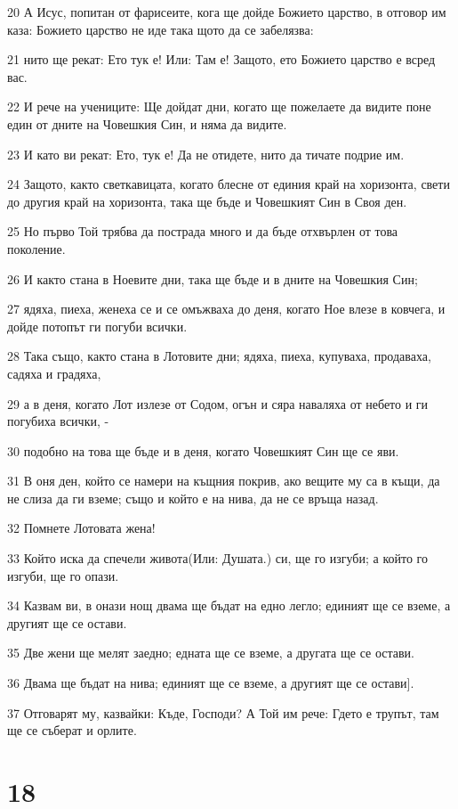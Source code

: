 \par 20 А Исус, попитан от фарисеите, кога ще дойде Божието царство, в отговор им каза: Божието царство не иде така щото да се забелязва:
\par 21 нито ще рекат: Ето тук е! Или: Там е! Защото, ето Божието царство е всред вас.
\par 22 И рече на учениците: Ще дойдат дни, когато ще пожелаете да видите поне един от дните на Човешкия Син, и няма да видите.
\par 23 И като ви рекат: Ето, тук е! Да не отидете, нито да тичате подрие им.
\par 24 Защото, както светкавицата, когато блесне от единия край на хоризонта, свети до другия край на хоризонта, така ще бъде и Човешкият Син в Своя ден.
\par 25 Но първо Той трябва да пострада много и да бъде отхвърлен от това поколение.
\par 26 И както стана в Ноевите дни, така ще бъде и в дните на Човешкия Син;
\par 27 ядяха, пиеха, женеха се и се омъжваха до деня, когато Ное влезе в ковчега, и дойде потопът ги погуби всички.
\par 28 Така също, както стана в Лотовите дни; ядяха, пиеха, купуваха, продаваха, садяха и градяха,
\par 29 а в деня, когато Лот излезе от Содом, огън и сяра наваляха от небето и ги погубиха всички, -
\par 30 подобно на това ще бъде и в деня, когато Човешкият Син ще се яви.
\par 31 В оня ден, който се намери на къщния покрив, ако вещите му са в къщи, да не слиза да ги вземе; също и който е на нива, да не се връща назад.
\par 32 Помнете Лотовата жена!
\par 33 Който иска да спечели живота(Или: Душата.) си, ще го изгуби; а който го изгуби, ще го опази.
\par 34 Казвам ви, в онази нощ двама ще бъдат на едно легло; единият ще се вземе, а другият ще се остави.
\par 35 Две жени ще мелят заедно; едната ще се вземе, а другата ще се остави.
\par 36 Двама ще бъдат на нива; единият ще се вземе, а другият ще се остави].
\par 37 Отговарят му, казвайки: Къде, Господи? А Той им рече: Гдето е трупът, там ще се съберат и орлите.

\chapter{18}

